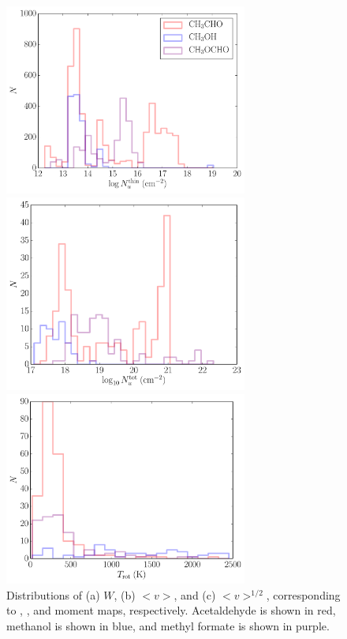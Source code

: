 \documentclass[iop,twocolappendix]{emulateapj}
\begin{document}
\begin{figure}[t]
\begin{center}
\includegraphics[width=8cm]{Nthin_hist.pdf}

\includegraphics[width=8cm]{Ntot_hist.pdf}

\includegraphics[width=8cm]{Trot_hist.pdf}
\caption{Distributions of (a) $W$, (b) $<v>$, and (c) $<v>^{1/2}$, corresponding to {\momzero}, {\momone}, and {\momtwo} moment maps, respectively. Acetaldehyde is shown in red, methanol is shown in blue, and methyl formate is shown in purple.}
\label{fig:tempdenhist}
\end{center}
\end{figure}
\end{document}
